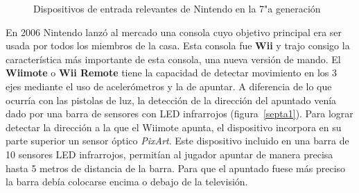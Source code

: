 \begin{figure}[t]
     \hfill
{}
     \caption{Dispositivos de entrada relevantes de Nintendo en la 7"a  generaci\'on}
     \label{fig:septima}
   \end{figure}

En 2006 Nintendo lanz\'o al mercado una consola cuyo objetivo principal era ser usada por todos los miembros de la casa. Esta consola fue \textbf{Wii} y trajo consigo la caracter\'istica m\'as importante de esta consola, una nueva versi\'on de mando. El \textbf{Wiimote} o \textbf{Wii Remote} tiene la capacidad de detectar movimiento en los 3 ejes mediante el uso de aceler\'ometros y la de apuntar. A diferencia de lo que ocurr\'ia con las pistolas de luz, la detecci\'on de la direcci\'on del apuntado ven\'ia dado por una barra de sensores con LED infrarrojos (figura~\ref{septa1}). Para lograr detectar la direcci\'on a la que el Wiimote apunta, el dispositivo incorpora en su parte superior un sensor \'optico \textit{PixArt}. Este dispositivo incluido en una barra de 10 sensores LED infrarrojos, permit\'ian al jugador apuntar de manera precisa hasta 5 metros de distancia de la barra. Para que el apuntado fuese m\'as preciso la barra deb\'ia colocarse encima o debajo de la televisi\'on.\\

